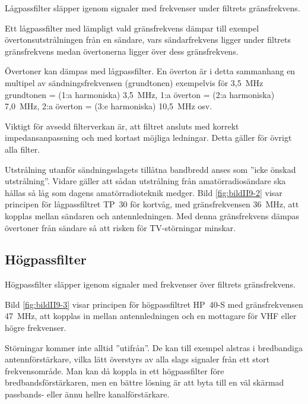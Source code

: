 
Lågpassfilter släpper igenom signaler med frekvenser under filtrets
gränsfrekvens.

Ett lågpassfilter med lämpligt vald gränsfrekvens dämpar till exempel
övertonsutstrålningen från en sändare, vars sändarfrekvens ligger under filtrets
gränsfrekvens medan övertonerna ligger över dess gränsfrekvens.

Övertoner kan dämpas med lågpassfilter.
En överton är i detta sammanhang en multipel av sändningsfrekvensen
(grundtonen) exempelvis för
3,5~MHz grundtonen = (1:a harmoniska) 3,5~MHz,
1:a överton = (2:a harmoniska) 7,0~MHz,
2:a överton = (3:e harmoniska) 10,5~MHz osv.

Viktigt för avsedd filterverkan är, att filtret ansluts med korrekt
impedansanpassning och med kortast möjliga ledningar.
Detta gäller för övrigt alla filter.

Utstrålning utanför sändningsslagets tillåtna bandbredd anses som
''icke önskad utstrålning''.
Vidare gäller att sådan utstrålning från amatörradiosändare ska hållas så låg
som dagens amatörradioteknik medger.
Bild \ref{fig:bildII9-2} visar principen för lågpassfiltret TP~30 för kortvåg,
med gränsfrekvensen 36~MHz, att kopplas mellan sändaren och antennledningen.
Med denna gränsfrekvens dämpas övertoner från sändare så att risken för
TV-störningar minskar.

\subsection{Högpassfilter}
\label{Högpassfilter}

Högpassfilter släpper igenom signaler med frekvenser över filtrets
gränsfrekvens.


Bild \ref{fig:bildII9-3} visar principen för högpassfiltret HP~40-S med
gränsfrekvensen 47~MHz, att kopplas in mellan antennledningen och en
mottagare för VHF eller högre frekvenser.

Störningar kommer inte alltid ''utifrån''.
De kan till exempel alstras i bredbandiga antennförstärkare, vilka lätt
överstyrs av alla slags signaler från ett stort frekvensområde.
Man kan då koppla in ett högpassfilter före bredbandsförstärkaren, men en
bättre lösning är att byta till en väl skärmad passbands- eller ännu hellre
kanalförstärkare.


